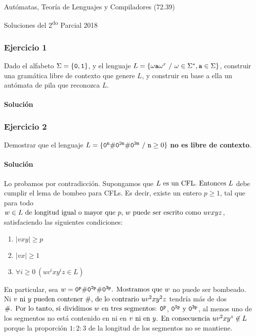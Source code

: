 \documentclass[spanish]{article}
\begin{document}
\centerline{\LARGE{Autómatas, Teoría de Lenguajes y Compiladores (72.39)}}
\vspace{6pt}
\centerline{\Large{Soluciones del 2\textsuperscript{do} Parcial 2018}}

\subsubsection*{Ejercicio 1}
Dado el alfabeto \(\Sigma = \{{\tt 0, 1}\}\), y el lenguaje \(L = \{\omega {\tt a} \omega^r~/~\omega \in \Sigma^*, {\tt a} \in \Sigma \}\),
  construir una gramática libre de contexto que genere \(L\), y construir en base a
  ella un autómata de pila que reconozca \(L\).

\paragraph{Solución}
\subsubsection*{Ejercicio 2}
Demostrar que el lenguaje $L=\{{\tt 0^n \# 0^{2n} \# 0^{3n} }~/~{\tt n}
  \geq 0 \}$ \textbf{no es libre de contexto}.

\paragraph{Solución}

Lo probamos por contradicción. Supongamos que \(L$ es un CFL.\@ Entonces $L\) debe
cumplir el lema de bombeo para CFLs. Es decir, existe un entero \(p \geq 1\), tal que para todo
\(w \in L$ de longitud igual o mayor que $p$, $w$ puede ser escrito como $uvxyz\),
satisfaciendo las siguientes condiciones:
\begin{enumerate}
  \item \(|vxy| \geq p\)
  \item \(|vx| \geq 1\)
  \item \(\forall i\geq 0~(uv^ixy^iz \in L) \)
\end{enumerate}

En particular, sea \(w = {\tt 0^{p} \# 0^{2p} \# 0^{3p}}$. Mostramos que $w\) no puede ser
bombeado. Ni \(v$ ni $y$ pueden contener $\#$, de lo contrario $uv^2xy^2z\) tendría
más de dos \(\#$. Por lo tanto, si dividimos $w$ en tres segmentos: $\tt 0^p\),
\(\tt 0^{2p}$ y $\tt 0^{3p}\), al menos uno de los segmentos no está contenido en
ni en \(v$ ni en $y$. En consecuencia $uv^2xy^z \not\in L\) porque la proporción
\(1:2:3\) de la longitud de los segmentos no se mantiene.
\end{document}
